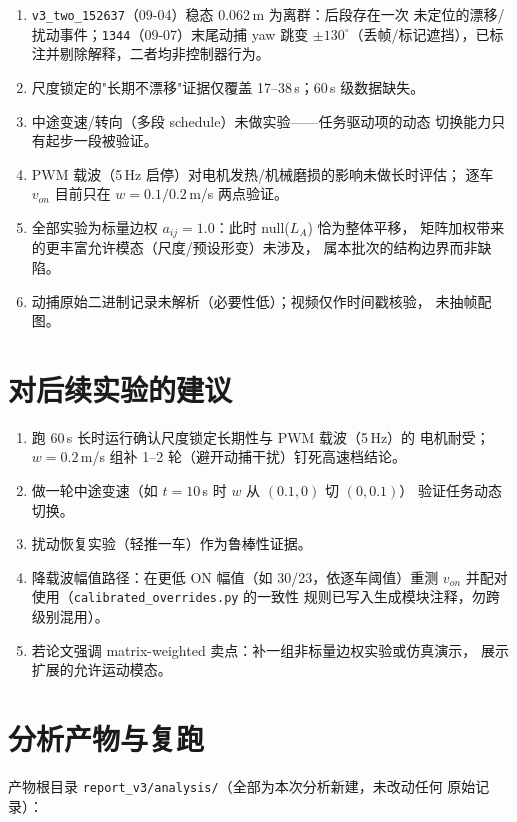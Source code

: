\documentclass[11pt,a4paper]{ctexart}
\newcommand{\run}[1]{\texttt{#1}}
\newcommand{\file}[1]{\texttt{#1}}
\newcommand{\degC}{^\circ}
\begin{document}
\begin{enumerate}
  \item \run{v3\_two\_152637}（09-04）稳态 0.062\,m 为离群：后段存在一次
        未定位的漂移/扰动事件；\run{1344}（09-07）末尾动捕 yaw 跳变
        $\pm130\degC$（丢帧/标记遮挡），已标注并剔除解释，二者均非控制器行为。
  \item 尺度锁定的"长期不漂移"证据仅覆盖 17--38\,s；60\,s 级数据缺失。
  \item 中途变速/转向（多段 schedule）未做实验——任务驱动项的动态
        切换能力只有起步一段被验证。
  \item PWM 载波（5\,Hz 启停）对电机发热/机械磨损的影响未做长时评估；
        逐车 $v_{on}$ 目前只在 $w{=}0.1/0.2$\,m/s 两点验证。
  \item 全部实验为标量边权 $a_{ij}=1.0$：此时 null($L_A$) 恰为整体平移，
        矩阵加权带来的更丰富允许模态（尺度/预设形变）未涉及，
        属本批次的结构边界而非缺陷。
  \item 动捕原始二进制记录未解析（必要性低）；视频仅作时间戳核验，
        未抽帧配图。
\end{enumerate}

\section{对后续实验的建议}

\begin{enumerate}
  \item 跑 60\,s 长时运行确认尺度锁定长期性与 PWM 载波（5\,Hz）的
        电机耐受；$w{=}0.2$\,m/s 组补 1--2 轮（避开动捕干扰）钉死高速档结论。
  \item 做一轮中途变速（如 $t=10$\,s 时 $w$ 从 $(0.1,0)$ 切 $(0,0.1)$）
        验证任务动态切换。
  \item 扰动恢复实验（轻推一车）作为鲁棒性证据。
  \item 降载波幅值路径：在更低 ON 幅值（如 30/23，依逐车阈值）重测
        $v_{on}$ 并配对使用（\file{calibrated\_overrides.py} 的一致性
        规则已写入生成模块注释，勿跨级别混用）。
  \item 若论文强调 matrix-weighted 卖点：补一组非标量边权实验或仿真演示，
        展示扩展的允许运动模态。
\end{enumerate}

\appendix
\section{分析产物与复跑}

产物根目录 \file{report\_v3/analysis/}（全部为本次分析新建，未改动任何
原始记录）：
\end{document}
